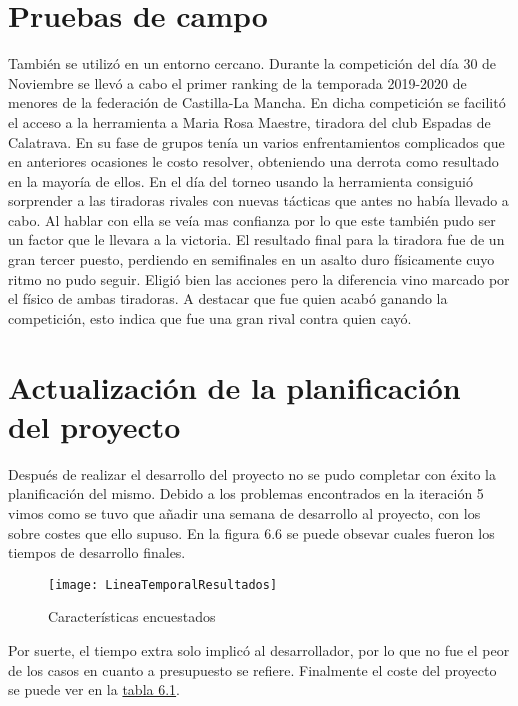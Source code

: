 \section{Pruebas de campo}
También se utilizó en un entorno cercano. Durante la competición del día 30 de Noviembre se llevó
a cabo el primer ranking de la temporada 2019-2020 de menores de la federación de Castilla-La Mancha.
En dicha competición se facilitó el acceso a la herramienta a Maria Rosa Maestre, tiradora del club
Espadas de Calatrava. En su fase de grupos tenía un varios enfrentamientos complicados que en anteriores
ocasiones le costo resolver, obteniendo una derrota como resultado en la mayoría de ellos. En el día
del torneo usando la herramienta consiguió sorprender a las tiradoras rivales con nuevas tácticas que
antes no había llevado a cabo. Al hablar con ella se veía mas confianza por lo que este también
pudo ser un factor que le llevara a la victoria. El resultado final para la tiradora fue de
un gran tercer puesto, perdiendo en semifinales en un asalto duro físicamente cuyo ritmo no pudo
seguir. Eligió bien las acciones pero la diferencia vino marcado por el físico de ambas tiradoras.
A destacar que fue quien acabó ganando la competición, esto indica que fue una gran rival contra
quien cayó.

\section{Actualización de la planificación del proyecto}
Después de realizar el desarrollo del proyecto no se pudo completar con éxito la planificación
del mismo. Debido a los problemas encontrados en la iteración 5 vimos como se tuvo que añadir
una semana de desarrollo al proyecto, con los sobre costes que ello supuso. En la figura 6.6
se puede obsevar cuales fueron los tiempos de desarrollo finales.

\begin{figure}[htb]
  \centering
  \texttt{[image: LineaTemporalResultados]}
  \caption[Características encuestados]{Características encuestados}
  \label{fig:Características encuestados}
\end{figure}

Por suerte, el tiempo extra solo implicó al desarrollador, por lo que no fue el peor de los
casos en cuanto a presupuesto se refiere. Finalmente el coste del proyecto se puede ver en
la \hyperref[tab:costes actualizados del proyecto]{tabla 6.1}.

